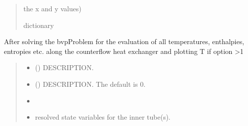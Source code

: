 \documentclass[letterpaper,10pt,english]{sphinxmanual}
\begin{document}
\begin{fulllineitems}
\begin{fulllineitems}
\begin{quote}
\begin{description}
\sphinxAtStartPar
{} \textendash{}
\begin{description}
\sphinxAtStartPar
the x and y values)

\end{description}


\sphinxAtStartPar
dictionary

\end{description}\end{quote}

\end{fulllineitems}


\begin{fulllineitems}
\label{\detokenize{heat_exchanger:heat_exchanger.counterflow_hex.he_state}}
\pysigstartsignatures
{}
\pysigstopsignatures
\sphinxAtStartPar
After solving the bvp\sphinxhyphen{}Problem for the evaluation of
all temperatures, enthalpies, entropies etc.
along the counterflow heat exchanger
and plotting T if option \textgreater{}1
\begin{quote}\begin{description}
\begin{itemize}
\item {} 
\sphinxAtStartPar
{} () \textendash{} DESCRIPTION.

\item {} 
\sphinxAtStartPar
{} (\sphinxstyleliteralemphasis{\sphinxupquote{, }}) \textendash{} DESCRIPTION. The default is 0.

\end{itemize}

\sphinxAtStartPar
\begin{itemize}
\item {} 
\sphinxAtStartPar
{}

\item {} 
\sphinxAtStartPar
{} \textendash{} resolved state variables for the inner tube(s).


\end{itemize}
\end{description}
\end{quote}
\end{fulllineitems}
\end{fulllineitems}
\end{document}
